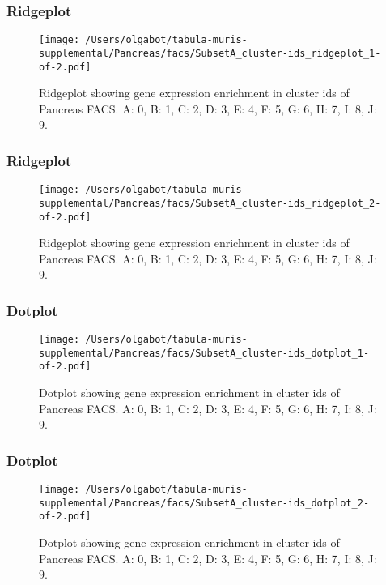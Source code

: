 \subsubsection{Ridgeplot}
\begin{figure}[h]
\centering
\texttt{[image: /Users/olgabot/tabula-muris-supplemental/Pancreas/facs/SubsetA\_cluster-ids\_ridgeplot\_1-of-2.pdf]}

\caption{ Ridgeplot  showing gene expression enrichment in cluster ids of Pancreas FACS. A: 0, B: 1, C: 2, D: 3, E: 4, F: 5, G: 6, H: 7, I: 8, J: 9.}
\end{figure}


\clearpage
\clearpage
\subsubsection{Ridgeplot}
\begin{figure}[h]
\centering
\texttt{[image: /Users/olgabot/tabula-muris-supplemental/Pancreas/facs/SubsetA\_cluster-ids\_ridgeplot\_2-of-2.pdf]}

\caption{ Ridgeplot  showing gene expression enrichment in cluster ids of Pancreas FACS. A: 0, B: 1, C: 2, D: 3, E: 4, F: 5, G: 6, H: 7, I: 8, J: 9.}
\end{figure}


\clearpage
\clearpage
\subsubsection{Dotplot}
\begin{figure}[h]
\centering
\texttt{[image: /Users/olgabot/tabula-muris-supplemental/Pancreas/facs/SubsetA\_cluster-ids\_dotplot\_1-of-2.pdf]}

\caption{ Dotplot  showing gene expression enrichment in cluster ids of Pancreas FACS. A: 0, B: 1, C: 2, D: 3, E: 4, F: 5, G: 6, H: 7, I: 8, J: 9.}
\end{figure}


\clearpage
\clearpage
\subsubsection{Dotplot}
\begin{figure}[h]
\centering
\texttt{[image: /Users/olgabot/tabula-muris-supplemental/Pancreas/facs/SubsetA\_cluster-ids\_dotplot\_2-of-2.pdf]}

\caption{ Dotplot  showing gene expression enrichment in cluster ids of Pancreas FACS. A: 0, B: 1, C: 2, D: 3, E: 4, F: 5, G: 6, H: 7, I: 8, J: 9.}
\end{figure}


